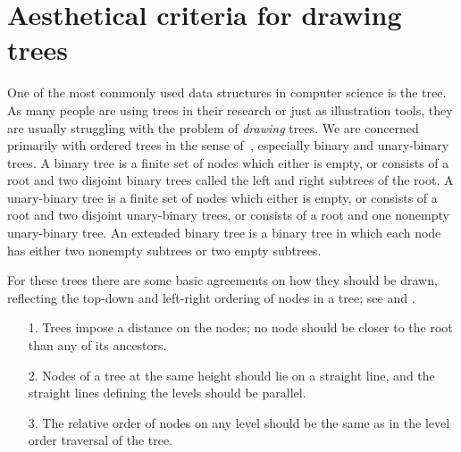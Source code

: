 \section{Aesthetical criteria for drawing trees}                                
                                                                                
One of the most commonly used data structures in computer science is the tree.  
As many people are using trees in their research or just as illustration        
tools, they are usually struggling with the problem of                          
\emph{drawing} trees. We are concerned primarily with ordered                   
trees in the sense of~\cite{ACP}, especially binary and unary-binary            
trees. A binary tree is a finite set of nodes which either                      
is empty, or consists of a root and two disjoint binary trees called            
the left and right subtrees of the root. A unary-binary tree is                 
a finite set of nodes which either is empty, or consists of a root and          
two disjoint unary-binary trees, or consists of a root and one                  
nonempty unary-binary tree. An extended binary tree is a binary tree            
in which each node has either two nonempty subtrees or two                      
empty subtrees.                                                                 
                                                                                
For these trees there                                                           
are some basic agreements on how they should be drawn, reflecting               
the top-down and left-right ordering of nodes in a tree;                        
see \cite{TidierTrees} and \cite{TidyTrees}.                                    
                                                                                
\begin{enumerate}                                                               
\item[1.] Trees impose a distance on the nodes; no node                         
          should be closer to the root than any of its                          
          ancestors.                                                            
\item[2.] Nodes of a tree at the same height should lie on a straight           
          line, and the straight lines defining the levels should be            
          parallel.                                                             
\item[3.] The relative order of nodes on any level should be the same           
          as in the level order traversal of the tree.                          
\end{enumerate}                                                                 
                                                                                
